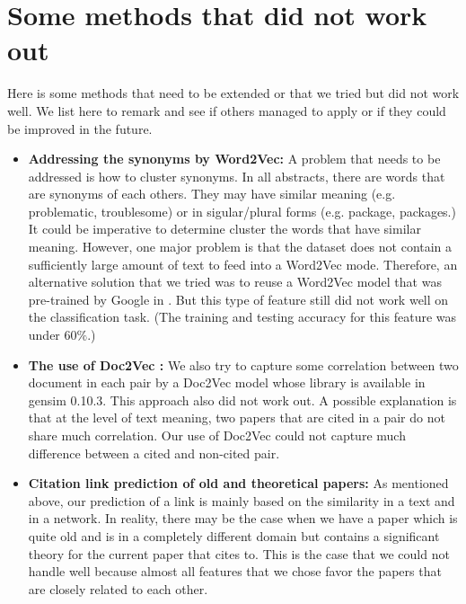 \documentclass{article}
\begin{document}
\section{Some methods that did not work out}
\label{sec:notwork}
Here is some methods that need to be extended or that we tried but did not work well. We list here to remark and see if others managed to apply or if they could be improved in the future.
\begin{itemize}
\item \textbf{Addressing the synonyms by Word2Vec:} A problem that needs to be addressed is how to cluster synonyms. In all abstracts, there are words that are synonyms of each others. They may have similar meaning (e.g. problematic, troublesome) or in sigular/plural forms (e.g. package, packages.) It could be imperative to determine cluster the words that have similar meaning. However, one major problem is that the dataset does not contain a sufficiently large amount of text to feed into a Word2Vec mode. Therefore, an alternative solution that we tried was to reuse a Word2Vec model that was pre-trained by Google in \cite{word2vecgg}. But this type of feature still did not work well on the classification task. (The training and testing accuracy for this feature was under 60$\%$.)
\item \textbf{The use of Doc2Vec \cite{DBLP:LeM14}:} We also try to capture some correlation between two document in each pair by a Doc2Vec model whose library is available in gensim 0.10.3. This approach also did not work out. A possible explanation is that at the level of text meaning, two papers that are cited in a pair do not share much correlation. Our use of Doc2Vec could not capture much difference between a cited and non-cited pair.
\item \textbf{Citation link prediction of old and theoretical papers:} As mentioned above, our prediction of a link is mainly based on the similarity in a text and in a network. In reality, there may be the case when we have a paper which is quite old and is in a completely different domain but contains a significant theory for the current paper that cites to. This is the case that we could not handle well because almost all features that we chose favor the papers that are closely related to each other.
\end{itemize}
\end{document}
